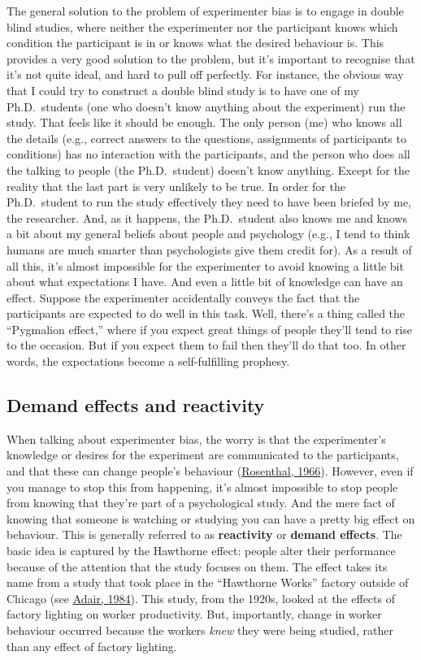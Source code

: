 \documentclass[
]{book}
\begin{document}
The general solution to the problem of experimenter bias is to engage in double blind studies, where neither the experimenter nor the participant knows which condition the participant is in or knows what the desired behaviour is. This provides a very good solution to the problem, but it's important to recognise that it's not quite ideal, and hard to pull off perfectly. For instance, the obvious way that I could try to construct a double blind study is to have one of my Ph.D.~students (one who doesn't know anything about the experiment) run the study. That feels like it should be enough. The only person (me) who knows all the details (e.g., correct answers to the questions, assignments of participants to conditions) has no interaction with the participants, and the person who does all the talking to people (the Ph.D.~student) doesn't know anything. Except for the reality that the last part is very unlikely to be true. In order for the Ph.D.~student to run the study effectively they need to have been briefed by me, the researcher. And, as it happens, the Ph.D.~student also knows me and knows a bit about my general beliefs about people and psychology (e.g., I tend to think humans are much smarter than psychologists give them credit for). As a result of all this, it's almost impossible for the experimenter to avoid knowing a little bit about what expectations I have. And even a little bit of knowledge can have an effect. Suppose the experimenter accidentally conveys the fact that the participants are expected to do well in this task. Well, there's a thing called the ``Pygmalion effect,'' where if you expect great things of people they'll tend to rise to the occasion. But if you expect them to fail then they'll do that too. In other words, the expectations become a self-fulfilling prophesy.

\hypertarget{demand-effects-and-reactivity}{%
\subsection{Demand effects and reactivity}\label{demand-effects-and-reactivity}}

When talking about experimenter bias, the worry is that the experimenter's knowledge or desires for the experiment are communicated to the participants, and that these can change people's behaviour (\protect\hyperlink{ref-Rosenthal1966}{Rosenthal, 1966}). However, even if you manage to stop this from happening, it's almost impossible to stop people from knowing that they're part of a psychological study. And the mere fact of knowing that someone is watching or studying you can have a pretty big effect on behaviour. This is generally referred to as {\textbf{reactivity}} or {\textbf{demand effects}}. The basic idea is captured by the Hawthorne effect: people alter their performance because of the attention that the study focuses on them. The effect takes its name from a study that took place in the ``Hawthorne Works'' factory outside of Chicago (see \protect\hyperlink{ref-Adair1984}{Adair, 1984}). This study, from the 1920s, looked at the effects of factory lighting on worker productivity. But, importantly, change in worker behaviour occurred because the workers \emph{knew} they were being studied, rather than any effect of factory lighting.
\end{document}
